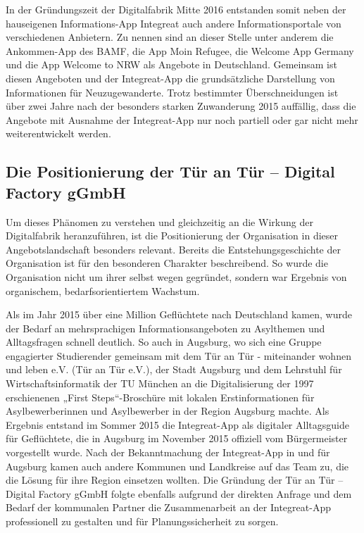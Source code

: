 \documentclass[12pt, a4paper]{article} %
\begin{document}
In der Gründungszeit der Digitalfabrik Mitte 2016 entstanden somit neben
der hauseigenen Informations-App Integreat auch andere
Informationsportale von verschiedenen Anbietern. Zu nennen sind an
dieser Stelle unter anderem die Ankommen-App des BAMF, die App Moin
Refugee, die Welcome App Germany und die App Welcome to NRW als Angebote
in Deutschland. Gemeinsam ist diesen Angeboten und der Integreat-App die
grundsätzliche Darstellung von Informationen für Neuzugewanderte. Trotz
bestimmter Überschneidungen ist über zwei Jahre nach der besonders
starken Zuwanderung 2015 auffällig, dass die Angebote mit Ausnahme der
Integreat-App nur noch partiell oder gar nicht mehr weiterentwickelt
werden.

\hypertarget{die-positionierung-der-tuxfcr-an-tuxfcr-digital-factory-ggmbh}{%
\subsection{Die Positionierung der Tür an Tür – Digital Factory
gGmbH}\label{die-positionierung-der-tuxfcr-an-tuxfcr-digital-factory-ggmbh}}

Um dieses Phänomen zu verstehen und gleichzeitig an die Wirkung der
Digitalfabrik heranzuführen, ist die Positionierung der Organisation in
dieser Angebotslandschaft besonders relevant. Bereits die
Entstehungsgeschichte der Organisation ist für den besonderen Charakter
beschreibend. So wurde die Organisation nicht um ihrer selbst wegen
gegründet, sondern war Ergebnis von organischem, bedarfsorientiertem
Wachstum.

Als im Jahr 2015 über eine Million Geflüchtete nach Deutschland kamen,
wurde der Bedarf an mehrsprachigen Informationsangeboten zu Asylthemen
und Alltagsfragen schnell deutlich. So auch in Augsburg, wo sich eine
Gruppe engagierter Studierender gemeinsam mit dem Tür an Tür -
miteinander wohnen und leben e.V. (Tür an Tür e.V.), der Stadt Augsburg
und dem Lehrstuhl für Wirtschaftsinformatik der TU München an die
Digitalisierung der 1997 erschienenen „First Steps“-Broschüre mit
lokalen Erstinformationen für Asylbewerberinnen und Asylbewerber in der
Region Augsburg machte. Als Ergebnis entstand im Sommer 2015 die
Integreat-App als digitaler Alltagsguide für Geflüchtete, die in
Augsburg im November 2015 offiziell vom Bürgermeister vorgestellt wurde.
Nach der Bekanntmachung der Integreat-App in und für Augsburg kamen auch
andere Kommunen und Landkreise auf das Team zu, die die Lösung für ihre
Region einsetzen wollten. Die Gründung der Tür an Tür – Digital Factory
gGmbH folgte ebenfalls aufgrund der direkten Anfrage und dem Bedarf der
kommunalen Partner die Zusammenarbeit an der Integreat-App professionell
zu gestalten und für Planungssicherheit zu sorgen.
\end{document}

